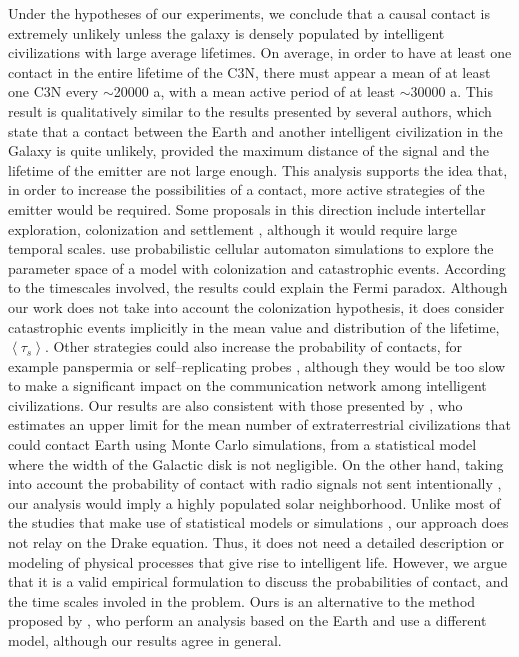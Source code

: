 \documentclass[crop]{CSLB}
\newcommand{\ceti}{C3N}
\begin{document}
Under the hypotheses of our experiments, we conclude that a causal
contact is extremely unlikely unless the galaxy is densely populated
by intelligent civilizations with large average lifetimes.
%
On average, in order to have at least one contact in the entire lifetime
of the \ceti{}, there must appear a mean of at least one \ceti{}
every $\sim$20000 a, with a mean active period of at least
$\sim$30000 a.
%
This result is qualitatively similar to the results presented by
several authors, which state that a contact between the Earth and
another intelligent civilization in the Galaxy is quite unlikely,
provided the maximum distance of the signal and the lifetime of the
emitter are not large enough.
%
This analysis supports the idea that, in order to increase the
possibilities of a contact, more active strategies of the emitter
would be required.
%
Some proposals in this direction include intertellar exploration,
colonization and settlement \citep{brin_great_1983, Dosovic2019,
galera_invasion_2019}, although it would require large temporal
scales.
%
\citet{Dosovic2019} use probabilistic cellular automaton simulations
to explore the parameter space of a model with colonization and
catastrophic events.
%
According to the timescales involved, the results could explain the
Fermi paradox.
%
Although our work does not take into account the colonization
hypothesis, it does consider catastrophic events implicitly in the
mean value and distribution of the lifetime, $\left<\tau_s\right>$.
%
Other strategies could also increase the probability of contacts, for
example panspermia \citep[e.g.,][]{starling_virulence_2013} or
self--replicating probes \citep[e.g.,][]{barlow_galactic_2013},
although they would be too slow to make a significant impact on the
communication network among intelligent civilizations.
%
Our results are also consistent with those presented by
\citet{grimaldi_signal_2017}, who estimates an upper limit for the mean
number of extraterrestrial civilizations that could contact Earth
using Monte Carlo simulations, from a statistical model where the width
of the Galactic disk is not negligible.
%
On the other hand, taking into account the probability of contact with
radio signals not sent intentionally \citep{horvat_calculating_2007},
our analysis would imply a highly populated solar neighborhood.
%
Unlike most 
of the studies that make use of statistical models or
simulations \citep{cirkovic_temporal_2004, smith_broadcasting_2009,
bloetscher_using_2019}, our approach does not relay on the Drake
equation.
%
Thus, it does not need
a detailed description or modeling of physical processes that give rise to
intelligent life.
%
However, we argue that it is a valid empirical formulation to discuss
the probabilities of contact, and the time scales involed in the
problem.
%
Ours is an alternative to the method proposed by
\citet{balbi_impact_2018}, who perform an analysis based on the Earth
and use a different model, although our results agree in general.
\end{document}
